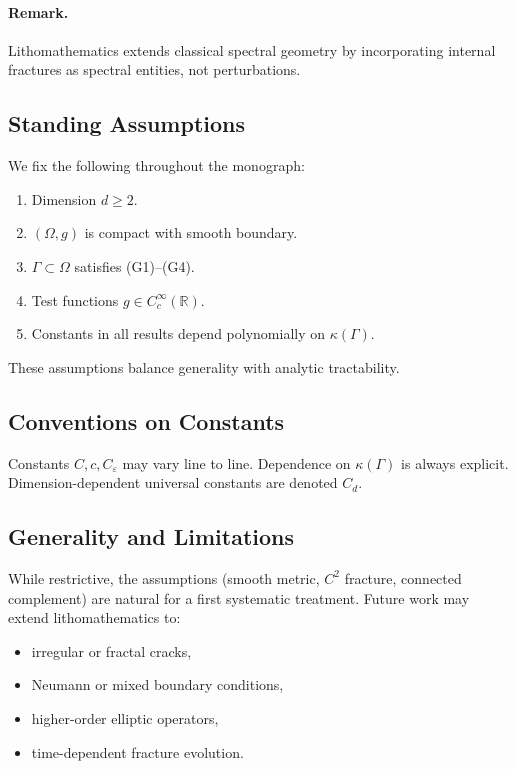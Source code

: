 \paragraph{Remark.} Lithomathematics extends classical spectral geometry by
incorporating internal fractures as spectral entities, not perturbations.

\subsection{Standing Assumptions}

We fix the following throughout the monograph:

\begin{enumerate}[label=(S\arabic*)]
  \item Dimension $d \geq 2$.
  \item $(\Omega,g)$ is compact with smooth boundary.
  \item $\Gamma \subset \Omega$ satisfies (G1)--(G4).
  \item Test functions $g \in C_c^\infty(\mathbb{R})$.
  \item Constants in all results depend polynomially on $\kappa(\Gamma)$.
\end{enumerate}

These assumptions balance generality with analytic tractability.

\subsection{Conventions on Constants}

Constants $C, c, C_\varepsilon$ may vary line to line. Dependence on
$\kappa(\Gamma)$ is always explicit. Dimension-dependent universal constants
are denoted $C_d$.

\subsection{Generality and Limitations}

While restrictive, the assumptions (smooth metric, $C^2$ fracture, connected
complement) are natural for a first systematic treatment. Future work may
extend lithomathematics to:
\begin{itemize}
  \item irregular or fractal cracks,
  \item Neumann or mixed boundary conditions,
  \item higher-order elliptic operators,
  \item time-dependent fracture evolution.
\end{itemize}

